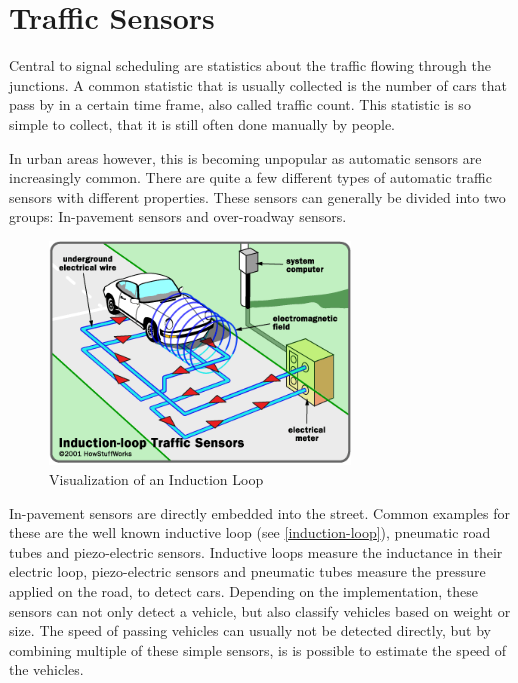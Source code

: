 \section{Traffic Sensors}
\label{trafficSensors}

Central to signal scheduling are statistics about the traffic flowing through the junctions. A common statistic that is usually collected is the number of cars that pass by in a certain time frame, also called traffic count. This statistic is so simple to collect, that it is still often done manually by people.

In urban areas however, this is becoming unpopular as automatic sensors are increasingly common. There are quite a few different types of automatic traffic sensors with different properties. These sensors can generally be divided into two groups: In-pavement sensors and over-roadway sensors. \cite{tmg}

\begin{figure}[ht]
	\centering
	\includegraphics[width=8cm]{figures/induction-loop}
	\caption{Visualization of an Induction Loop}
	\label{induction-loop}
\end{figure}

In-pavement sensors are directly embedded into the street. Common examples for these are the well known inductive loop (see \autoref{induction-loop}), pneumatic road tubes and piezo-electric sensors. Inductive loops measure the inductance in their electric loop, piezo-electric sensors and pneumatic tubes measure the pressure applied on the road, to detect cars. Depending on the implementation, these sensors can not only detect a vehicle, but also classify vehicles based on weight or size. The speed of passing vehicles can usually not be detected directly, but by combining multiple of these simple sensors, is is possible to estimate the speed of the vehicles.

